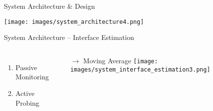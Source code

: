 

\begin{frame}{System Architecture \& Design}
	\vspace*{-1.5em}
	\begin{center}
		\texttt{[image: images/system\_architecture4.png]}
	\end{center}
\end{frame}


\begin{frame}{System Architecture -- Interface Estimation}
	\vspace*{-1.5em}
	\begin{center}
			\begin{columns}
				\begin{enumerate}
					\item Passive Monitoring
					\item Active Probing
				\end{enumerate}
				\vspace*{.5em}
				$\rightarrow$ Moving Average
				\texttt{[image: images/system\_interface\_estimation3.png]}
			\end{columns}
	\end{center}
\end{frame}

